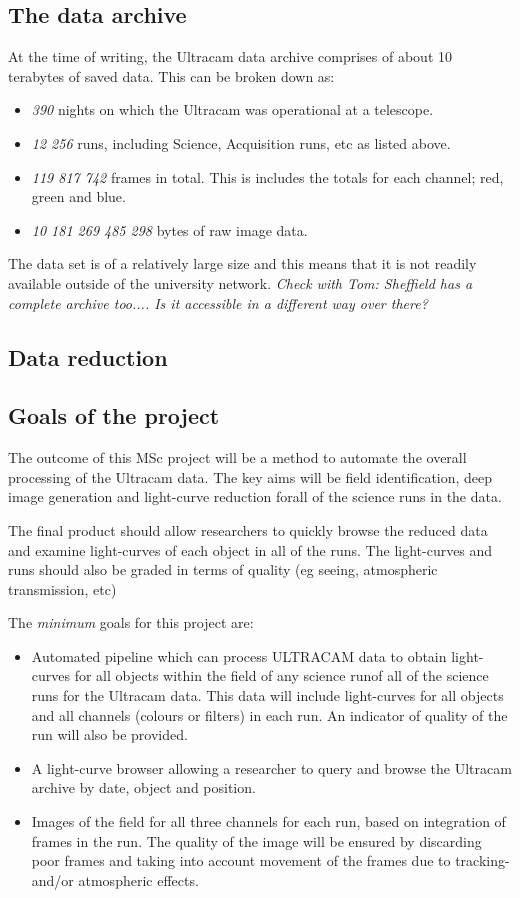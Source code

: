 \documentclass[a4paper,10pt]{article}
\begin{document}
\subsection{The data archive}
At the time of writing, the Ultracam data archive comprises of about 10 terabytes of saved data. This can be broken down as:
\begin{itemize}
	\item \emph{390} nights on which the Ultracam was operational at a telescope.
	\item \emph{12 256} runs, including Science, Acquisition runs, etc as listed above. 
	\item \emph{119 817 742} frames in total. This is includes the totals for each channel; red, green and blue.
	\item \emph{10 181 269 485 298} bytes of raw image data.
\end{itemize} 
The data set is of a relatively large size and this means that it is not readily available outside of the university network. \emph{Check with Tom: Sheffield has a complete archive too.... Is it accessible in a different way over there?} 

\subsection{Data reduction}


\subsection{Goals of the project}

The outcome of this MSc project will be a method to automate the overall processing of the Ultracam data. The key aims will be field identification, deep image generation and light-curve reduction forall of the science runs in the data. 

The final product should allow researchers to quickly browse the reduced data and examine light-curves of each object in all of the 
runs. The light-curves and runs should also be graded in terms of quality (eg seeing, atmospheric transmission, etc) 

The \emph{minimum} goals for this project are:
\begin{itemize}
	\item Automated pipeline which can process ULTRACAM data to obtain light-curves for all objects within the field of any science runof all of the science runs for the Ultracam data. This data will include light-curves for all objects and all channels (colours or filters) in each run. An indicator of quality of the run will also be provided. 
	\item A light-curve browser allowing a researcher to query and browse the Ultracam archive by date, object and position.
	\item Images of the field for all three channels for each run, based on integration of frames in the run. The quality of the image will be ensured by discarding poor frames and taking into account movement of the frames due to tracking- and/or atmospheric effects. 
\end{itemize}
\end{document}
